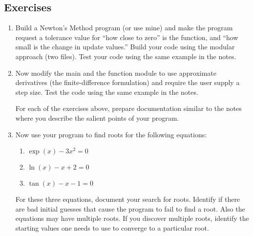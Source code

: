 \subsection{Exercises}
\begin{enumerate}
\item Build a Newton's Method program (or use mine) and make the program request a tolerance value for ``how close to zero'' is the function, and ``how small is the change in update values.''  Build your code using the modular approach (two files).  Test your code using the same example in the notes.

\item Now modify the main and the function module to use approximate derivatives (the finite-difference formulation) and require the user supply a step size.   Test the code using the same example in the notes.

For each of the exercises above, prepare documentation similar to the notes where you describe the salient points of your program.   

\item  Now use your program to find roots for the following equations:
\begin{enumerate}
\item $\exp(x) - 3x^2 =0$ \\
\item $\ln(x) - x + 2 = 0$ \\
\item $\tan(x) - x - 1 = 0$ \\
\end{enumerate}
For these three equations, document your search for roots.  Identify if there are bad initial guesses that cause the program to fail to find a root.   Also the equations may have multiple roots.  If you discover multiple roots, identify the starting values one needs to use to converge to a particular root.


\end{enumerate}

\clearpage




